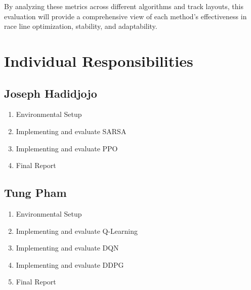 \documentclass{article}
\begin{document}
By analyzing these metrics across different algorithms and track layouts, this evaluation will provide a comprehensive view of each method’s effectiveness in race line optimization, stability, and adaptability.


\section{Individual Responsibilities}
\subsection{Joseph Hadidjojo}
\begin{enumerate}
\item Environmental Setup
\item Implementing and evaluate SARSA
\item Implementing and evaluate PPO
\item Final Report
\end{enumerate}
\subsection{Tung Pham}
\begin{enumerate}
\item Environmental Setup
\item Implementing and evaluate Q-Learning 
\item Implementing and evaluate DQN
\item Implementing and evaluate DDPG
\item Final Report
\end{enumerate}





\end{document}
